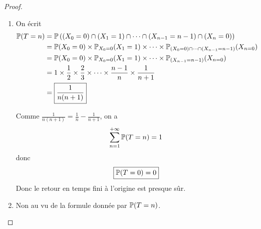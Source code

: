 \documentclass[12pt]{article}
\begin{document}
\begin{proof}
\begin{enumerate}
        \item On écrit 
        \begin{align}
            \P(T=n)
            &=\P\left(\left(X_{0}=0\right)\cap\left(X_{1}=1\right)\cap\dots\cap\left(X_{n-1}=n-1\right)\cap\left(X_{n}=0\right)\right)\\
            &=\P(X_{0}=0)\times\P_{X_{0}=0}(X_{1}=1)\times\dots\times\P_{\left(X_{0}=0\right)\cap\dots\cap\left(X_{n-1}=n-1\right)}(X_{n=0})\\
            &=\P(X_{0}=0)\times\P_{X_{0}=0}(X_{1}=1)\times\dots\times\P_{\left(X_{n-1}=n-1\right)}(X_{n=0})\\
            &=1\times\frac{1}{2}\times\frac{2}{3}\times\dots\times\frac{n-1}{n}\times\frac{1}{n+1}\\
            &=\boxed{\frac{1}{n(n+1)}}
        \end{align}

        Comme $\frac{1}{n(n+1)}=\frac{1}{n}-\frac{1}{n+1}$, on a 
        \begin{equation}
            \sum_{n=1}^{+\infty}\P(T=n)=1
        \end{equation}
        donc 
        \begin{equation}
            \boxed{\P(T=0)=0}
        \end{equation}
        Donc le retour en temps fini à l'origine est presque sûr.

        \item Non au vu de la formule donnée par $\P(T=n)$.
    \end{enumerate}
\end{proof}
\end{document}
